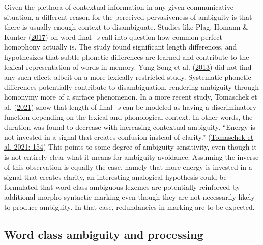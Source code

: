 \documentclass[
]{article}
\begin{document}
Given the plethora of contextual information in any given communicative
situation, a different reason for the perceived pervasiveness of
ambiguity is that there is usually enough context to disambiguate.
Studies like Plag, Homann \& Kunter
(\protect\hyperlink{ref-plag17}{2017}) on word-final \emph{-s} call into
question how common perfect homophony actually is. The study found
significant length differences, and hypothesizes that subtle phonetic
differences are learned and contribute to the lexical representation of
words in memory. Yung Song et al.
(\protect\hyperlink{ref-song_et_al13}{2013}) did not find any such
effect, albeit on a more lexically restricted study. Systematic phonetic
differences potentially contribute to disambiguation, rendering
ambiguity through homonymy more of a surface phenomenon. In a more
recent study, Tomaschek et al.
(\protect\hyperlink{ref-tomaschek_et_al21}{2021}) show that length of
final \emph{-s} can be modeled as having a discriminatory function
depending on the lexical and phonological context. In other words, the
duration was found to decrease with increasing contextual ambiguity.
``Energy is not invested in a signal that creates confusion instead of
clarity.'' (\protect\hyperlink{ref-tomaschek_et_al21}{Tomaschek et al.
2021: 154}) This points to some degree of ambiguity sensitivity, even
though it is not entirely clear what it means for ambiguity avoidance.
Assuming the inverse of this observation is equally the case, namely
that more energy is invested in a signal that creates clarity, an
interesting analogical hypothesis could be formulated that word class
ambiguous lexemes are potentially reinforced by additional
morpho-syntactic marking even though they are not necessarily likely to
produce ambiguity. In that case, redundancies in marking are to be
expected.

\hypertarget{proc}{%
\subsection{Word class ambiguity and processing}\label{proc}}
\end{document}
